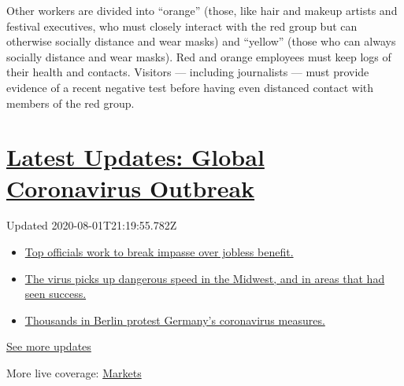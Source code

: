 Other workers are divided into ``orange'' (those, like hair and makeup
artists and festival executives, who must closely interact with the red
group but can otherwise socially distance and wear masks) and ``yellow''
(those who can always socially distance and wear masks). Red and orange
employees must keep logs of their health and contacts. Visitors ---
including journalists --- must provide evidence of a recent negative
test before having even distanced contact with members of the red group.

\hypertarget{latest-updates-global-coronavirus-outbreak}{%
\section{\texorpdfstring{\href{https://www.nytimes3xbfgragh.onion/2020/08/01/world/coronavirus-covid-19.html?action=click\&pgtype=Article\&state=default\&region=MAIN_CONTENT_1\&context=storylines_live_updates}{Latest
Updates: Global Coronavirus
Outbreak}}{Latest Updates: Global Coronavirus Outbreak}}\label{latest-updates-global-coronavirus-outbreak}}

Updated 2020-08-01T21:19:55.782Z

\begin{itemize}
\tightlist
\item
  \href{https://www.nytimes3xbfgragh.onion/2020/08/01/world/coronavirus-covid-19.html?action=click\&pgtype=Article\&state=default\&region=MAIN_CONTENT_1\&context=storylines_live_updates\#link-3ac56579}{Top
  officials work to break impasse over jobless benefit.}
\item
  \href{https://www.nytimes3xbfgragh.onion/2020/08/01/world/coronavirus-covid-19.html?action=click\&pgtype=Article\&state=default\&region=MAIN_CONTENT_1\&context=storylines_live_updates\#link-8796723}{The
  virus picks up dangerous speed in the Midwest, and in areas that had
  seen success.}
\item
  \href{https://www.nytimes3xbfgragh.onion/2020/08/01/world/coronavirus-covid-19.html?action=click\&pgtype=Article\&state=default\&region=MAIN_CONTENT_1\&context=storylines_live_updates\#link-25930521}{Thousands
  in Berlin protest Germany's coronavirus measures.}
\end{itemize}

\href{https://www.nytimes3xbfgragh.onion/2020/08/01/world/coronavirus-covid-19.html?action=click\&pgtype=Article\&state=default\&region=MAIN_CONTENT_1\&context=storylines_live_updates}{See
more updates}

More live coverage:
\href{https://www.nytimes3xbfgragh.onion/live/2020/07/31/business/stock-market-today-coronavirus?action=click\&pgtype=Article\&state=default\&region=MAIN_CONTENT_1\&context=storylines_live_updates}{Markets}

